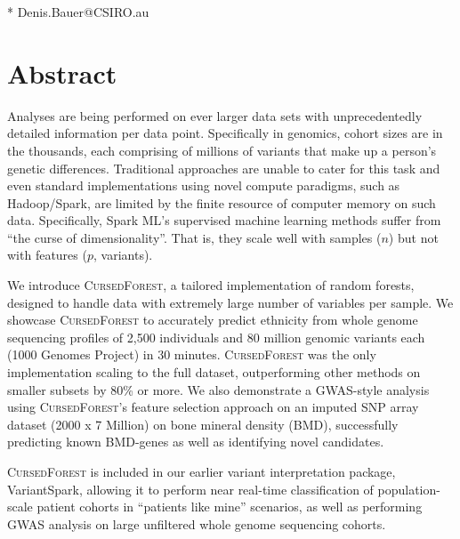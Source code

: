 \documentclass[10pt,letterpaper]{article}
\newcommand{\cursedforest}{\textsc{CursedForest}\xspace}
\begin{document}
\begin{flushleft}



* Denis.Bauer@CSIRO.au
\end{flushleft}


\section{Abstract}

Analyses are being performed on ever larger data sets with unprecedentedly detailed information per data point. Specifically in
genomics, cohort sizes are in the thousands, each comprising of millions of variants that make up a person's genetic
differences. Traditional approaches are unable to cater for this task and even standard implementations using novel
compute paradigms, such as Hadoop/Spark, are limited by the finite resource of computer memory on such
data. Specifically, Spark ML's supervised machine learning methods suffer from ``the curse of dimensionality''. That is,
they scale well with samples ($n$) but not with features ($p$, variants).

We introduce \cursedforest, a tailored implementation of random forests, designed to handle data with extremely large
number of variables per sample. We showcase \cursedforest to accurately predict ethnicity from whole genome sequencing
profiles of 2,500 individuals and 80 million genomic variants each (1000 Genomes Project) in 30 minutes. \cursedforest
was the only implementation scaling to the full dataset, outperforming other methods on smaller subsets by 80\% or
more. We also demonstrate a GWAS-style analysis using \cursedforest's feature selection approach on an imputed SNP array
dataset (2000 x 7 Million) on bone mineral density (BMD), successfully predicting known BMD-genes as well as identifying
novel candidates.

\cursedforest is included in our earlier variant interpretation package, VariantSpark, allowing it to perform near
real-time classification of population-scale patient cohorts in ``patients like mine'' scenarios, as well as performing
GWAS analysis on large unfiltered whole genome sequencing cohorts.
\end{document}
